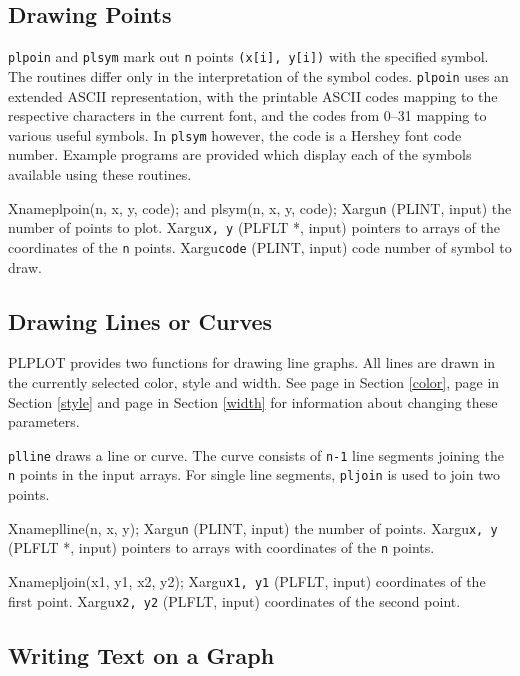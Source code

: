 \subsection {Drawing Points}
{\tt plpoin} and {\tt plsym} mark out {\tt n} points
{\tt (x[i], y[i])} with the
specified symbol. The routines differ only in the interpretation
of the symbol
codes. {\tt plpoin} uses an extended ASCII representation, with the
printable
ASCII codes mapping to the respective characters in the current font, and
the codes from 0--31 mapping to various useful symbols.
In {\tt plsym} however, 
the code is a Hershey font code number. Example programs are provided
which display each of the symbols available using these routines.

Xname{plpoin(n, x, y, code); {\rm and } plsym(n, x, y, code);}
Xargu{{\tt n} (PLINT, input)}
{the number of points to plot.}
Xargu{{\tt x, y} (PLFLT *, input)}
{pointers to arrays of the coordinates of the {\tt n} points.}
Xargu{{\tt code} (PLINT, input)}
{code number of symbol to draw.}

\subsection {Drawing Lines or Curves}

PLPLOT provides two functions for drawing line graphs.
All lines are drawn in
the currently selected color, style and width. See page \pageref{color} in
Section \ref{color}, page \pageref{style} in Section \ref{style} and
page \pageref{width} in Section \ref{width} for
information about changing these parameters.

{\tt plline} draws a line or curve. The curve consists of {\tt n-1} line
segments joining the {\tt n} points in the input arrays. For single line
segments, {\tt pljoin} is used to join two points.

Xname{plline(n, x, y);}
Xargu{{\tt n} (PLINT, input)}
{the number of points.}
Xargu{{\tt x, y} (PLFLT *, input)}
{pointers to arrays with coordinates of the {\tt n} points.}

Xname{pljoin(x1, y1, x2, y2);}
Xargu{{\tt x1, y1} (PLFLT, input)}
{coordinates of the first point.}
Xargu{{\tt x2, y2} (PLFLT, input)}
{coordinates of the second point.}

\subsection {Writing Text on a Graph} \label {graph-text}

